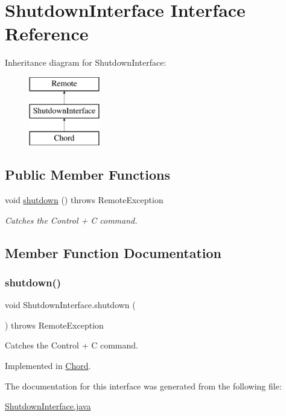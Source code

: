 \hypertarget{interface_shutdown_interface}{}\section{Shutdown\+Interface Interface Reference}
\label{interface_shutdown_interface}
Inheritance diagram for Shutdown\+Interface\+:\begin{figure}[H]
\begin{center}
\leavevmode
\includegraphics[height=3.000000cm]{interface_shutdown_interface}
\end{center}
\end{figure}
\subsection*{Public Member Functions}
\begin{DoxyCompactItemize}
\item 
void \hyperlink{interface_shutdown_interface_a16c9cfd61247e825a49564a4daab3286}{shutdown} ()  throws Remote\+Exception
\begin{DoxyCompactList}\small\item\em Catches the Control + C command. \end{DoxyCompactList}\end{DoxyCompactItemize}


\subsection{Member Function Documentation}
\hypertarget{interface_shutdown_interface_a16c9cfd61247e825a49564a4daab3286}{}\label{interface_shutdown_interface_a16c9cfd61247e825a49564a4daab3286} 
\subsubsection{\texorpdfstring{shutdown()}{shutdown()}}
{\footnotesize\ttfamily void Shutdown\+Interface.\+shutdown (\begin{DoxyParamCaption}{ }\end{DoxyParamCaption}) throws Remote\+Exception}



Catches the Control + C command. 



Implemented in \hyperlink{class_chord_a8616150947d5fa4095187325bc9f8a60}{Chord}.



The documentation for this interface was generated from the following file\+:\begin{DoxyCompactItemize}
\item 
\hyperlink{_shutdown_interface_8java}{Shutdown\+Interface.\+java}\end{DoxyCompactItemize}
